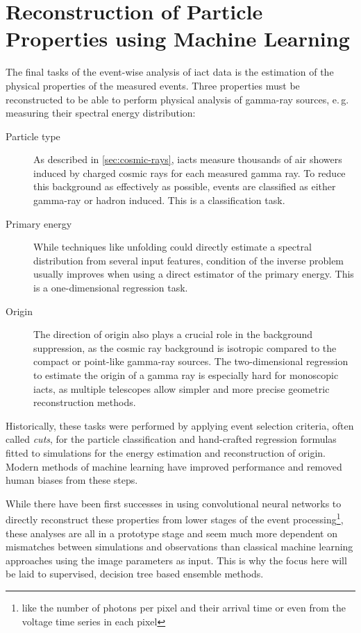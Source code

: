 \chapter{Reconstruction of Particle Properties using Machine Learning}\label{chp:reconstruction}

The final tasks of the event-wise analysis of \gls{iact} data is the estimation
of the physical properties of the measured events.
Three properties must be reconstructed to be able to perform physical analysis
of gamma-ray sources, e.\,g. measuring their spectral energy distribution:
\begin{description}
  \item[Particle type] As described in \autoref{sec:cosmic-rays}, \glspl{iact}
    measure thousands of air showers induced by charged cosmic rays for each
    measured gamma ray.
    To reduce this background as effectively as possible, events are classified
    as either gamma-ray or hadron induced.
    This is a classification task.
  \item[Primary energy] While techniques like unfolding could directly estimate
    a spectral distribution from several input features, condition of the inverse
    problem usually improves when using a direct estimator of the primary energy.
    This is a one-dimensional regression task.
  \item[Origin] The direction of origin also plays a crucial role in
    the background suppression, as the cosmic ray background is isotropic 
    compared to the compact or point-like gamma-ray sources.
    The two-dimensional regression to estimate the origin of a gamma ray
    is especially hard for monoscopic \glspl{iact}, as multiple telescopes
    allow simpler and more precise geometric reconstruction methods.
\end{description}

\noindent Historically, these tasks were performed by applying event selection criteria,
often called \emph{cuts}, for the particle classification and hand-crafted
regression formulas fitted to simulations for the energy estimation and reconstruction
of origin.
Modern methods of machine learning have improved performance and removed human biases
from these steps.

While there have been first successes \cite{hess_deep_learning,cta_index_dnn} in using convolutional neural networks
to directly reconstruct these properties from lower stages of the event 
processing\footnote{like the number of photons per pixel and their arrival time or 
even from the voltage time series in each pixel}, these analyses are all
in a prototype stage and seem much more dependent on mismatches between simulations
and observations than classical machine learning approaches using the image parameters
as input.
This is why the focus here will be laid to supervised, decision tree based ensemble methods.

